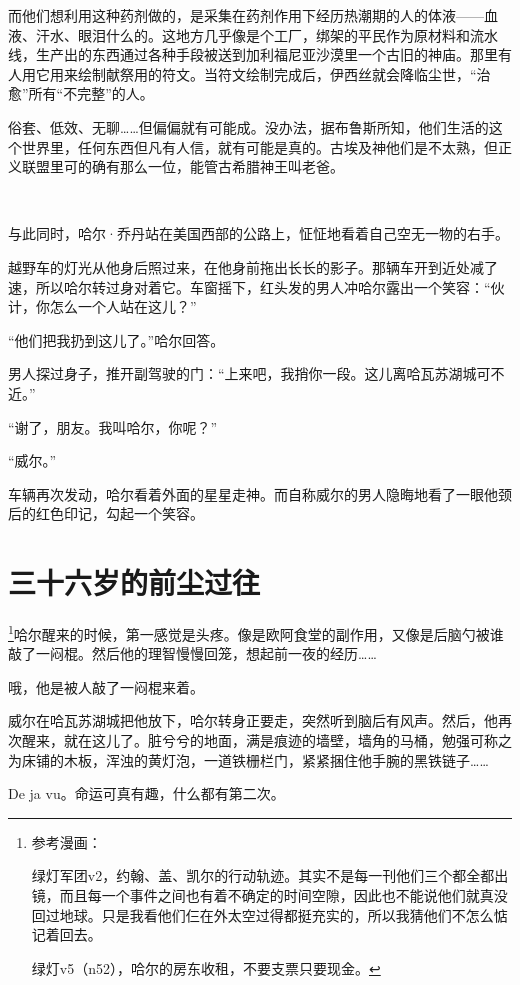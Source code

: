 \documentclass[../main]{subfiles}
\begin{document}
而他们想利用这种药剂做的，是采集在药剂作用下经历热潮期的人的体液——血液、汗水、眼泪什么的。这地方几乎像是个工厂，绑架的平民作为原材料和流水线，生产出的东西通过各种手段被送到加利福尼亚沙漠里一个古旧的神庙。那里有人用它用来绘制献祭用的符文。当符文绘制完成后，伊西丝就会降临尘世，“治愈”所有“不完整”的人。

俗套、低效、无聊……但偏偏就有可能成。没办法，据布鲁斯所知，他们生活的这个世界里，任何东西但凡有人信，就有可能是真的。古埃及神他们是不太熟，但正义联盟里可的确有那么一位，能管古希腊神王叫老爸。

~\

与此同时，哈尔·乔丹站在美国西部的公路上，怔怔地看着自己空无一物的右手。

越野车的灯光从他身后照过来，在他身前拖出长长的影子。那辆车开到近处减了速，所以哈尔转过身对着它。车窗摇下，红头发的男人冲哈尔露出一个笑容：“伙计，你怎么一个人站在这儿？”

“他们把我扔到这儿了。”哈尔回答。

男人探过身子，推开副驾驶的门：“上来吧，我捎你一段。这儿离哈瓦苏湖城可不近。”

“谢了，朋友。我叫哈尔，你呢？”

“威尔。”

车辆再次发动，哈尔看着外面的星星走神。而自称威尔的男人隐晦地看了一眼他颈后的红色印记，勾起一个笑容。


\section{三十六岁的前尘过往}

\footnote[1]{参考漫画：

    绿灯军团v2，约翰、盖、凯尔的行动轨迹。其实不是每一刊他们三个都全都出镜，而且每一个事件之间也有着不确定的时间空隙，因此也不能说他们就真没回过地球。只是我看他们仨在外太空过得都挺充实的，所以我猜他们不怎么惦记着回去。

    绿灯v5（n52），哈尔的房东收租，不要支票只要现金。}哈尔醒来的时候，第一感觉是头疼。像是欧阿食堂的副作用，又像是后脑勺被谁敲了一闷棍。然后他的理智慢慢回笼，想起前一夜的经历……

哦，他是被人敲了一闷棍来着。

威尔在哈瓦苏湖城把他放下，哈尔转身正要走，突然听到脑后有风声。然后，他再次醒来，就在这儿了。脏兮兮的地面，满是痕迹的墙壁，墙角的马桶，勉强可称之为床铺的木板，浑浊的黄灯泡，一道铁栅栏门，紧紧捆住他手腕的黑铁链子……

De ja vu。命运可真有趣，什么都有第二次。
\end{document}
